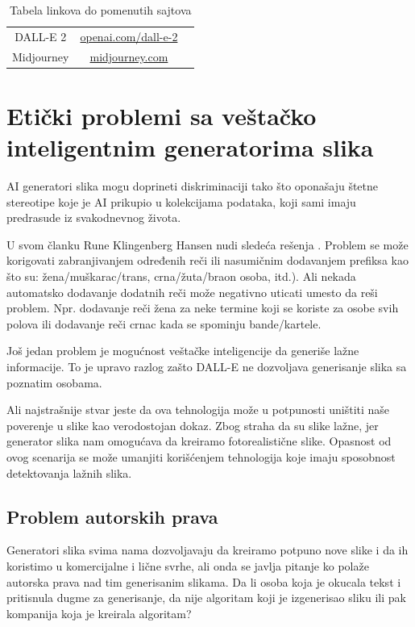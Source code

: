 \documentclass[12pt, letterpaper]{article}
\begin{document}
\begin{table}[htp]
\begin{center}
\begin{tabular}{ |c|c|c| } 
 \hline
 DALL-E 2 & \href{https://openai.com/dall-e-2/}{openai.com/dall-e-2} \\
 Midjourney & \href{https://www.midjourney.com/}{midjourney.com} \\
 \hline
\end{tabular}
\caption{\label{fig: tabela}Tabela linkova do pomenutih sajtova}
\end{center}
\end{table}

\section{Etički problemi sa veštačko inteligentnim generatorima slika}

AI generatori slika mogu doprineti diskriminaciji tako što oponašaju štetne stereotipe koje je AI prikupio u kolekcijama podataka, koji sami imaju predrasude iz svakodnevnog života.

U svom članku Rune Klingenberg Hansen nudi sledeća rešenja \cite{kljuc1}. Problem se može korigovati zabranjivanjem određenih reči ili nasumičnim dodavanjem prefiksa kao što su: žena/muškarac/trans, crna/žuta/braon osoba, itd.). Ali nekada automatsko dodavanje dodatnih reči može negativno uticati umesto da reši problem. Npr. dodavanje reči žena za neke termine koji se koriste za osobe svih polova ili dodavanje reči crnac kada se spominju bande/kartele.

Još jedan problem je mogućnost veštačke inteligencije da generiše lažne informacije. To je upravo razlog zašto DALL-E \cite{poznate} ne dozvoljava generisanje slika sa poznatim osobama.

Ali najstrašnije stvar jeste da ova tehnologija može u potpunosti uništiti naše poverenje u slike kao verodostojan dokaz. Zbog straha da su slike lažne, jer generator slika nam omogućava da kreiramo fotorealistične slike. Opasnost od ovog scenarija se može umanjiti korišćenjem tehnologija koje imaju sposobnost detektovanja lažnih slika.



\subsection{Problem autorskih prava}

Generatori slika svima nama dozvoljavaju da kreiramo potpuno nove slike i da ih koristimo u komercijalne i lične svrhe, ali onda se javlja pitanje ko polaže autorska prava nad tim generisanim slikama. Da li osoba koja je okucala tekst i pritisnula dugme za generisanje, da nije algoritam koji je izgenerisao sliku ili pak kompanija koja je kreirala algoritam?
\end{document}
